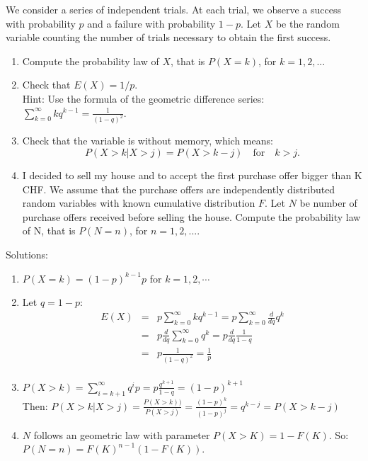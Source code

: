 \documentclass[12pt,thmsa]{article}
\begin{document}
We consider a series of independent trials. At each trial, we observe a success with probability $p$ and a failure with probability $1-p$. Let $X$ be the random variable counting the number of trials necessary to
obtain the first success.
\begin{enumerate}
  \item Compute the probability law of $X$, that is $P(X=k)$, for $k=1,2,..$.
  \item Check that $E(X)=1/p$. \\
  Hint: Use the formula of the geometric difference series: $\sum_{k=0}^\infty k q^{k-1}=\frac{1}{(1-q)^2}$.
  \item Check that the variable is without memory, which means:
  \begin{equation*}
    P(X>k\vert X>j)=P(X>k-j) \quad \text{for} \quad k>j.
  \end{equation*}
  \item I decided to sell my house and to accept the first purchase offer bigger than K CHF. We assume that the purchase offers are independently distributed random variables
  with known cumulative distribution $F$. Let $N$ be number of purchase offers received before selling the house.
  Compute the probability law of N, that is $P(N=n)$, for $n=1,2,...$.
\end{enumerate}
\noindent Solutions:
\begin{enumerate}
  \item $P(X=k)= (1-p)^{k-1}p$ \quad for $k=1,2,\cdots $
  \item  Let $q=1-p$:\begin{eqnarray*}
  E(X) &=& p \sum_{k=0}^{\infty} k q^{k-1} = p \sum_{k=0}^{\infty} \frac{d}{dq} q^k \\
   &=& p \frac{d}{dq} \sum_{k=0}^{\infty} q^k = p \frac{d}{dq} \frac{1}{1-q}  \\
   &=& p  \frac{1}{(1-q)^2}=\frac{1}{p}  \\
\end{eqnarray*}
  \item  $P(X>k)=\sum_{i=k+1}^\infty q^i p=p \frac{q^{k+1}}{1-q}=(1-p)^{k+1}$\\
  Then: $P(X>k\vert X>j)=\frac{P(X>k))}{P(X>j)}=\frac{(1-p)^{k}}{(1-p)^{j}}=q^{k-j}=P(X>k-j)$
  \item $N$ follows an geometric law with parameter $P(X>K)=1-F(K)$.
  So: $P(N=n)=F(K)^{n-1} (1-F(K))$.
\end{enumerate}
\end{document}
